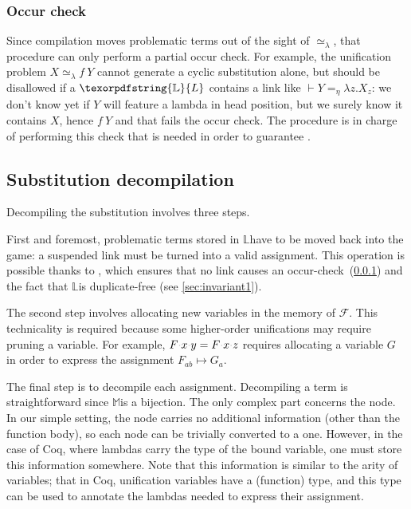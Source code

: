 \documentclass[sigconf,natbib=false,review]{acmart}
\newcommand{\appsep}{\ensuremath{\textcolor{lightgray}{\cdot}}}
\newcommand{\UnifRel}{\ensuremath{\simeq}}
\newcommand{\Ue}{\ensuremath{\UnifRel_\lambda}\xspace}
\newcommand{\Fo}{\texorpdfstring{\ensuremath{\mathcal{F}\xspace}}{F}} %
\newcommand{\linketaM}[3]{\ensuremath{#1 \vdash #2 =_\eta #3}}
\newcommand{\linkStore}{\texorpdfstring{\ensuremath{\mathbb{L}}\xspace}{L}}
\newcommand{\mapStore}{\texorpdfstring{\ensuremath{\mathbb{M}}\xspace}{M}}
\begin{document}
\subsubsection{Occur check}\label{sec:oc}
Since compilation moves problematic terms out of the sight of \Ue{},
that procedure can only perform a partial occur check. For example, the
unification problem $X \Ue f~Y$ cannot generate a cyclic substitution alone,
but should be disallowed if a $\linkStore$ contains a link like
$\linketaM{}{Y}{\lambda z.X_z}$: we don't know yet if $Y$ will feature
a lambda in head position, but we surely know it contains $X$, hence
$f~Y$ and that fails the occur check.
The procedure  is in charge of
performing this check that is needed in order to
guarantee .


\subsection{Substitution decompilation}\label{sec:decompilation}

Decompiling the substitution involves three steps.

First and foremost, problematic terms stored in
\linkStore have to be moved back into the game:
a suspended link must be turned into a valid assignment.
This operation is possible thanks to ,
which ensures that no link causes an occur-check~(\ref{sec:oc})
and the fact that \linkStore is duplicate-free (see \cref{sec:invariant1}).

The second step involves allocating new variables in the
memory of \Fo{}. This technicality is required because some
higher-order unifications may require pruning a variable. For example,
$F\appsep x\appsep y = F\appsep x\appsep z$ requires allocating a 
variable $G$ in order to express the assignment $F_{ab} \mapsto G_a$.

The final step is to decompile each assignment.
Decompiling a term is straightforward since \mapStore is a bijection.
The only complex part concerns the  node. In our simple setting,
the  node carries no additional information (other than the function body),
so each  node can be trivially converted to a  one.
However, in the case of Coq, where lambdas carry the type of the bound variable, one
must store this information somewhere. Note that this information is similar
to the arity of variables; that in Coq, unification variables have a
(function) type, and this type can be used to annotate the lambdas
needed to express their assignment.
\end{document}
